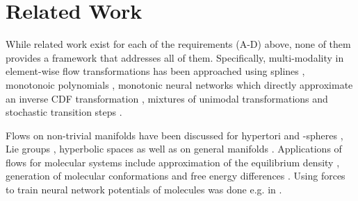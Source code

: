 \documentclass{article}
\begin{document}



\section{Related Work}
While related work exist for each of the requirements (A-D) above, none of them provides a framework that addresses all of them.
Specifically, multi-modality in element-wise flow transformations has been approached using splines \cite{durkan2019neural, muller2018neural}, monotonoic polynomials \cite{jaini2019sum, ramasinghe2021robust}, monotonic neural networks which directly approximate an inverse CDF transformation \cite{huang2018neural, de2019block}, mixtures of unimodal transformations \cite{ ho2019flow++, rezende2020normalizing} and stochastic transition steps \cite{wu2020snf, cornish2020relaxing}.

Flows on non-trivial manifolds have been discussed for hypertori and -spheres \cite{rezende2020normalizing}, Lie groups \cite{falorsi2019reparameterizing, boyda2021sampling}, hyperbolic spaces \cite{bose2020latent} as well as on general manifolds \cite{falorsi2021continuous, gemici2016normalizing, mathieu2020riemannian, lou2020neural, brehmer2020flows, kalatzis2021multi}.
Applications of flows for molecular systems include approximation of the equilibrium density \cite{noe2019boltzmann, wu2020snf, kohler2020equivariant}, generation of molecular conformations \cite{xu2021learning, satorras2021n} and free energy differences \cite{wirnsberger2020targeted, ding2021deepbar}.
Using forces to train neural network potentials of molecules was done e.g. in  \cite{wang2019machine, husic2020coarse}.
\end{document}
